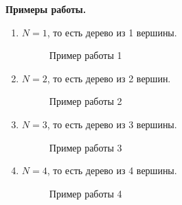 \documentclass[12pt, a4paper]{article}
\begin{document}
\textbf{Примеры работы.}
\begin{enumerate}
	\item $N=1$, то есть дерево из 1 вершины.
	\begin{figure}[h]
  		\caption{Пример работы 1}
	\end{figure}
	\newpage
	\item $N=2$, то есть дерево из 2 вершин.
	\begin{figure}[h]
  		\caption{Пример работы 2}
	\end{figure}
	\item $N=3$, то есть дерево из 3 вершины.
	\begin{figure}[h]
  		\caption{Пример работы 3}
	\end{figure}
	\newpage
	\item $N=4$, то есть дерево из 4 вершины.
	\begin{figure}[h]
  		\caption{Пример работы 4}
	\end{figure}
\end{enumerate}
\newpage
\end{document}
